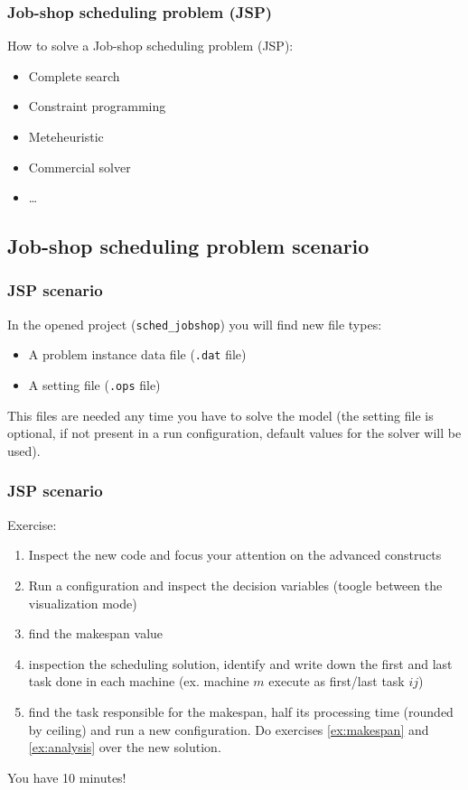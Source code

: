 \begin{frame} \frametitle{Job-shop scheduling problem (JSP)}
\pause
How to solve a Job-shop scheduling problem (JSP):\pause
\begin{itemize}[<+->]
\item Complete search
\item Constraint programming
\item Meteheuristic
\item Commercial solver
\item \dots
\end{itemize}


\end{frame}

\subsection{Job-shop scheduling problem scenario}

\begin{frame} \frametitle{JSP scenario}
\pause
In the opened project (\texttt{sched\_jobshop}) you will find new file types:\pause
\begin{itemize}[<+->]
\item A problem instance data file (\texttt{.dat} file)
\item A setting file (\texttt{.ops} file)
\end{itemize}

\pause \medskip

This files are needed any time you have to solve the model (the setting file is optional, if not present in a run configuration, default values for the solver will be used).

\end{frame}


\begin{frame} \frametitle{JSP scenario}
\pause
Exercise:\pause
\begin{enumerate}[<+->]
\item Inspect the new code and focus your attention on the advanced constructs
\item Run a configuration and inspect the decision variables (toogle between the visualization mode)
\item \label{ex:makespan} find the makespan value
\item \label{ex:analysis} inspection the scheduling solution, identify and write down the first and last task done in each machine (ex. machine $m$ execute as first/last task $ij$)
\item find the task responsible for the makespan, half its processing time (rounded by ceiling) and run a new configuration. Do exercises \ref{ex:makespan} and \ref{ex:analysis} over the new solution.
\end{enumerate}

\pause \medskip

You have 10 minutes!

\end{frame}

